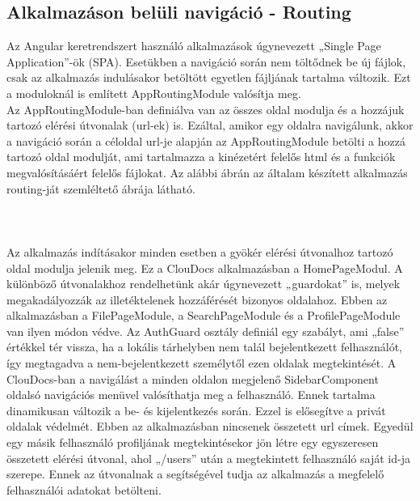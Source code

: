 \documentclass[12pt, twoside]{report}
\begin{document}
\subsection{Alkalmazáson belüli navigáció - Routing}
Az Angular keretrendszert használó alkalmazások úgynevezett „Single Page Application”-ök (SPA). Esetükben a navigáció során nem töltődnek be új fájlok, csak az alkalmazás indulásakor betöltött egyetlen fájljának tartalma változik. Ezt a moduloknál is említett AppRoutingModule valósítja meg.\\
Az AppRoutingModule-ban definiálva van az összes oldal modulja és a hozzájuk tartozó elérési útvonalak (url-ek) is. Ezáltal, amikor egy oldalra navigálunk, akkor a navigáció során a céloldal url-je alapján az AppRoutingModule betölti a hozzá tartozó oldal modulját, ami tartalmazza a kinézetért felelős html és a funkciók megvalósításáért felelős fájlokat. Az alábbi ábrán az általam készített alkalmazás routing-ját szemléltető ábrája látható.\\
\\
\\
\\
Az alkalmazás indításakor minden esetben a gyökér elérési útvonalhoz tartozó oldal modulja jelenik meg. Ez a ClouDocs alkalmazásban a HomePageModul. A különböző útvonalakhoz rendelhetünk akár úgynevezett „guardokat” is, melyek megakadályozzák az illetéktelenek hozzáférését bizonyos oldalahoz. Ebben az alkalmazásban a FilePageModule, a SearchPageModule és a ProfilePageModule van ilyen módon védve. Az AuthGuard osztály definiál egy szabályt, ami „false” értékkel tér vissza, ha a lokális tárhelyben nem talál bejelentkezett felhasználót, így megtagadva a nem-bejelentkezett személytől ezen oldalak megtekintését. A ClouDocs-ban a navigálást a minden oldalon megjelenő SidebarComponent oldalsó navigációs menüvel valósíthatja meg a felhasználó. Ennek tartalma dinamikusan változik a be- és kijelentkezés során. Ezzel is elősegítve a privát oldalak védelmét. Ebben az alkalmazásban nincsenek összetett url címek. Egyedül egy másik felhasználó profiljának megtekintésekor jön létre egy egyszeresen összetett elérési útvonal, ahol „/users” után a megtekintett felhasználó saját id-ja szerepe. Ennek az útvonalnak a segítségével tudja az alkalmazás a megfelelő felhasználói adatokat betölteni.
\end{document}
